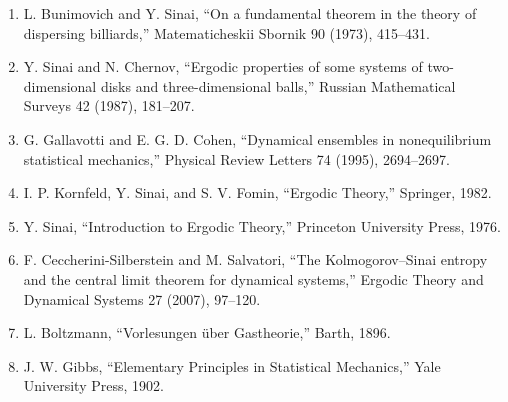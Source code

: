 \begin{enumerate}
\item L. Bunimovich and Y. Sinai, ``On a fundamental theorem in the theory of dispersing billiards,'' Matematicheskii Sbornik 90 (1973), 415--431.
\item Y. Sinai and N. Chernov, ``Ergodic properties of some systems of two-dimensional disks and three-dimensional balls,'' Russian Mathematical Surveys 42 (1987), 181--207.
\item G. Gallavotti and E. G. D. Cohen, ``Dynamical ensembles in nonequilibrium statistical mechanics,'' Physical Review Letters 74 (1995), 2694--2697.
\item I. P. Kornfeld, Y. Sinai, and S. V. Fomin, ``Ergodic Theory,'' Springer, 1982.
\item Y. Sinai, ``Introduction to Ergodic Theory,'' Princeton University Press, 1976.
\item F. Ceccherini-Silberstein and M. Salvatori, ``The Kolmogorov--Sinai entropy and the central limit theorem for dynamical systems,'' Ergodic Theory and Dynamical Systems 27 (2007), 97--120.
\item L. Boltzmann, ``Vorlesungen \"uber Gastheorie,'' Barth, 1896.
\item J. W. Gibbs, ``Elementary Principles in Statistical Mechanics,'' Yale University Press, 1902.
\end{enumerate}
